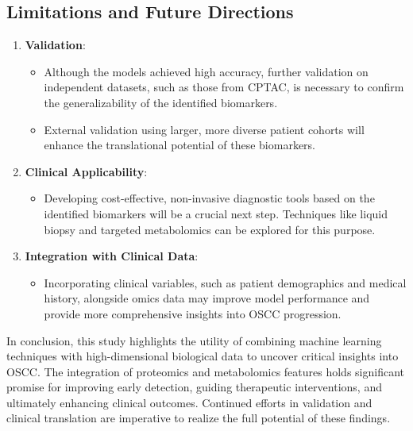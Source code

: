 \documentclass[a4paper,12pt]{article}
\begin{document}
\subsection*{Limitations and Future Directions}
\begin{enumerate}
	\item \textbf{Validation}:
	      \begin{itemize}
		      \item Although the models achieved high accuracy, further validation on independent datasets, such as those from CPTAC, is necessary to confirm the generalizability of the identified biomarkers.
		      \item External validation using larger, more diverse patient cohorts will enhance the translational potential of these biomarkers.
	      \end{itemize}
	\item \textbf{Clinical Applicability}:
	      \begin{itemize}
		      \item Developing cost-effective, non-invasive diagnostic tools based on the identified biomarkers will be a crucial next step. Techniques like liquid biopsy and targeted metabolomics can be explored for this purpose.
	      \end{itemize}
	\item \textbf{Integration with Clinical Data}:
	      \begin{itemize}
		      \item Incorporating clinical variables, such as patient demographics and medical history, alongside omics data may improve model performance and provide more comprehensive insights into OSCC progression.
	      \end{itemize}
\end{enumerate}

In conclusion, this study highlights the utility of combining machine learning techniques with high-dimensional biological data to uncover critical insights into OSCC. The integration of proteomics and metabolomics features holds significant promise for improving early detection, guiding therapeutic interventions, and ultimately enhancing clinical outcomes. Continued efforts in validation and clinical translation are imperative to realize the full potential of these findings.
\end{document}
